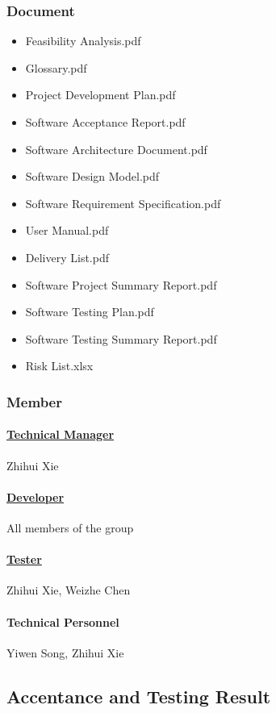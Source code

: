 \documentclass[10pt]{article}
\begin{document}
\subsubsection{Document}
\begin{itemize}
	\item Feasibility Analysis.pdf
	\item Glossary.pdf
	\item Project Development Plan.pdf
	\item Software Acceptance Report.pdf
	\item Software Architecture Document.pdf
	\item Software Design Model.pdf
	\item Software Requirement Specification.pdf
	\item User Manual.pdf
	\item Delivery List.pdf
	\item Software Project Summary Report.pdf
	\item Software Testing Plan.pdf
	\item Software Testing Summary Report.pdf
	\item Risk List.xlsx
\end{itemize}

\subsubsection{Member}
\paragraph{\underline{Technical Manager}} Zhihui Xie

\paragraph{\underline{Developer}} All members of the group

\paragraph{\underline{Tester}} Zhihui Xie, Weizhe Chen

\paragraph{Technical Personnel} Yiwen Song, Zhihui Xie

\subsection{Accentance and Testing Result}
\end{document}

